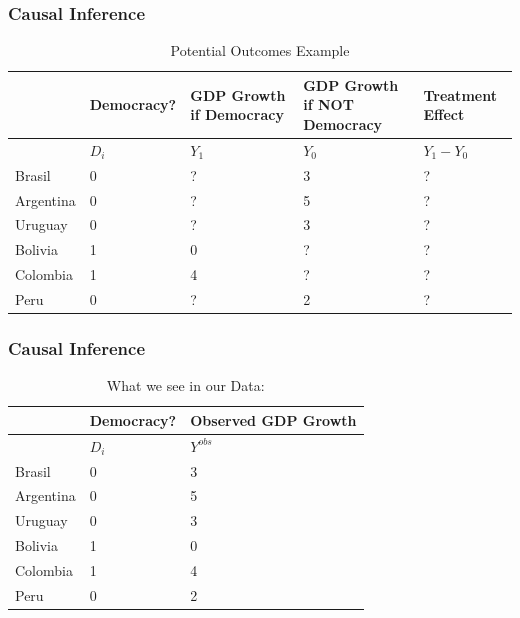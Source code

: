 \documentclass[xcolor=x11names,compress]{beamer}\usepackage[]{graphicx}\usepackage[]{color}
\renewcommand{\(}{\begin{columns}}
\renewcommand{\)}{\end{columns}}
\newcommand{\<}[1]{\begin{column}{#1}}
\renewcommand{\>}{\end{column}}
\begin{document}
\begin{frame}
\frametitle{Causal Inference}
\footnotesize
\begin{table}[htbp]
  \centering
  \caption{Potential Outcomes Example}
    \begin{tabular}{|p{1.8cm}|p{1.8cm}|p{2cm}|p{2cm}|p{2cm}|}
    \hline
          & \multicolumn{1}{p{1.8cm}|}{Democracy?} & \multicolumn{1}{p{2cm}|}{GDP Growth if Democracy} & \multicolumn{1}{p{2.2cm}|}{GDP Growth if NOT Democracy} & \textbf{Treatment Effect} \bigstrut\\
    \hline
          & \multicolumn{1}{p{1.8cm}|}{$D_i$} & \multicolumn{1}{p{2cm}|}{$Y_1$} & \multicolumn{1}{p{2.2cm}|}{$Y_0$} & \multicolumn{1}{p{1.8cm}|}{$Y_{1} - Y_{0}$} \bigstrut\\
    \hline
    Brasil & 0 & ?     & 3     & ? \bigstrut\\
    \hline
    Argentina & 0 & ?    & 5     & ? \bigstrut\\
    \hline
    Uruguay & 0 & ? & 3 & ?  \bigstrut\\
    \hline
    Bolivia & 1  & 0     & ?     & ? \bigstrut\\
    \hline
    Colombia & 1  & 4    & ?    & ? \bigstrut\\
    \hline
    Peru & 0 & ?     & 2     & ? \bigstrut\\
\hline
    \end{tabular}%
  \label{tab:addlabel}%
\end{table}%
\normalsize
\end{frame}

\begin{frame}
\frametitle{Causal Inference}
\footnotesize
\begin{table}[htbp]
  \centering
  \caption{What we see in our Data:}
    \begin{tabular}{|p{1.8cm}|p{1.8cm}|p{2cm}|}
    \hline
          & \multicolumn{1}{p{1.8cm}|}{Democracy?} & \textbf{Observed} GDP Growth \bigstrut\\
    \hline
          & \multicolumn{1}{p{1.8cm}|}{$D_i$} & \multicolumn{1}{p{1.8cm}|}{$Y^{obs}$} \bigstrut\\
    \hline
    Brasil & 0 & 3 \bigstrut\\
    \hline
    Argentina & 0      & 5 \bigstrut\\
    \hline
    Uruguay & 0 & 3  \bigstrut\\
    \hline
    Bolivia & 1      & 0 \bigstrut\\
    \hline
    Colombia & 1    & 4 \bigstrut\\
    \hline
    Peru & 0 & 2 \bigstrut\\
    \hline
    \end{tabular}%
  \label{tab:addlabel}%
\end{table}%
\normalsize
\end{frame}
\end{document}
